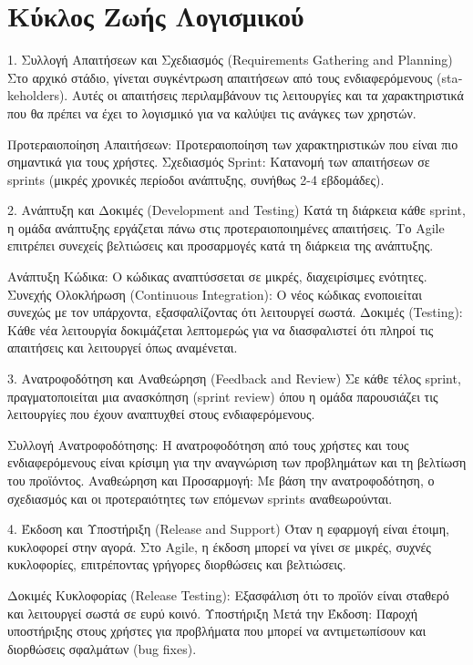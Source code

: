 \documentclass{article}
\begin{document}
\section{Κύκλος Ζωής Λογισμικού}
1. Συλλογή Απαιτήσεων και Σχεδιασμός (\textlatin{Requirements Gathering and Planning})
Στο αρχικό στάδιο, γίνεται συγκέντρωση απαιτήσεων από τους ενδιαφερόμενους (\textlatin{stakeholders}). Αυτές οι απαιτήσεις περιλαμβάνουν τις λειτουργίες και τα χαρακτηριστικά που θα πρέπει να έχει το λογισμικό για να καλύψει τις ανάγκες των χρηστών.

Προτεραιοποίηση Απαιτήσεων: Προτεραιοποίηση των χαρακτηριστικών που είναι πιο σημαντικά για τους χρήστες.
Σχεδιασμός \textlatin{Sprint}: Κατανομή των απαιτήσεων σε \textlatin{sprints} (μικρές χρονικές περίοδοι ανάπτυξης, συνήθως 2-4 εβδομάδες).

2. Ανάπτυξη και Δοκιμές (\textlatin{Development and Testing})
Κατά τη διάρκεια κάθε \textlatin{sprint}, η ομάδα ανάπτυξης εργάζεται πάνω στις προτεραιοποιημένες απαιτήσεις. Το \textlatin{Agile} επιτρέπει συνεχείς βελτιώσεις και προσαρμογές κατά τη διάρκεια της ανάπτυξης.

Ανάπτυξη Κώδικα: Ο κώδικας αναπτύσσεται σε μικρές, διαχειρίσιμες ενότητες.
Συνεχής Ολοκλήρωση (\textlatin{Continuous Integration}): Ο νέος κώδικας ενοποιείται συνεχώς με τον υπάρχοντα, εξασφαλίζοντας ότι λειτουργεί σωστά.
Δοκιμές (\textlatin{Testing}): Κάθε νέα λειτουργία δοκιμάζεται λεπτομερώς για να διασφαλιστεί ότι πληροί τις απαιτήσεις και λειτουργεί όπως αναμένεται.

3. Ανατροφοδότηση και Αναθεώρηση (\textlatin{Feedback and Review})
Σε κάθε τέλος \textlatin{sprint}, πραγματοποιείται μια ανασκόπηση (\textlatin{sprint review}) όπου η ομάδα παρουσιάζει τις λειτουργίες που έχουν αναπτυχθεί στους ενδιαφερόμενους.

Συλλογή Ανατροφοδότησης: Η ανατροφοδότηση από τους χρήστες και τους ενδιαφερόμενους είναι κρίσιμη για την αναγνώριση των προβλημάτων και τη βελτίωση του προϊόντος.
Αναθεώρηση και Προσαρμογή: Με βάση την ανατροφοδότηση, ο σχεδιασμός και οι προτεραιότητες των επόμενων \textlatin{sprints} αναθεωρούνται.

4. Έκδοση και Υποστήριξη (\textlatin{Release and Support})
Όταν η εφαρμογή είναι έτοιμη, κυκλοφορεί στην αγορά. Στο \textlatin{Agile}, η έκδοση μπορεί να γίνει σε μικρές, συχνές κυκλοφορίες, επιτρέποντας γρήγορες διορθώσεις και βελτιώσεις.

Δοκιμές Κυκλοφορίας (\textlatin{Release Testing}): Εξασφάλιση ότι το προϊόν είναι σταθερό και λειτουργεί σωστά σε ευρύ κοινό.
Υποστήριξη Μετά την Έκδοση: Παροχή υποστήριξης στους χρήστες για προβλήματα που μπορεί να αντιμετωπίσουν και διορθώσεις σφαλμάτων (\textlatin{bug fixes}).
\end{document}
